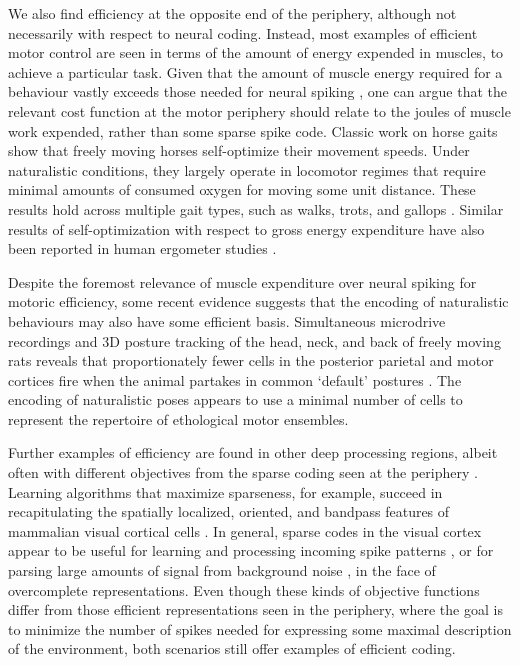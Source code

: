 \documentclass{article}
\begin{document}
We also find efficiency at the opposite end of the periphery, although not necessarily with respect to neural coding. Instead, most examples of efficient motor control are seen in terms of the amount of energy expended in muscles, to achieve a particular task. Given that the amount of muscle energy required for a behaviour vastly exceeds those needed for neural spiking \cite{sengupta_2010, ortega_2015}, one can argue that the relevant cost function at the motor periphery should relate to the joules of muscle work expended, rather than some sparse spike code. Classic work on horse gaits show that freely moving horses self-optimize their movement speeds. Under naturalistic conditions, they largely operate in locomotor regimes that require minimal amounts of consumed oxygen for moving some unit distance. These results hold across multiple gait types, such as walks, trots, and gallops \cite{hoyt_taylor_1981}. Similar results of self-optimization with respect to gross energy expenditure have also been reported in human ergometer studies \cite{sparrow_newell_1998}. 

Despite the foremost relevance of muscle expenditure over neural spiking for motoric efficiency, some recent evidence suggests that the encoding of naturalistic behaviours may also have some efficient basis. Simultaneous microdrive recordings and 3D posture tracking of the head, neck, and back of freely moving rats reveals that proportionately fewer cells in the posterior parietal and motor cortices fire when the animal partakes in common `default' postures \cite{Mimica_Dunn_Tombaz_Bojja_Whitlock_2018}. The encoding of naturalistic poses appears to use a minimal number of cells to represent the repertoire of ethological motor ensembles. 

Further examples of efficiency are found in other deep processing regions, albeit often with different objectives from the sparse coding seen at the periphery \cite{simoncelli_2003}. Learning algorithms that maximize sparseness, for example, succeed in recapitulating the spatially localized, oriented, and bandpass features of mammalian visual cortical cells \cite{olshausen_field_1996}. In general, sparse codes in the visual cortex appear to be useful for learning and processing incoming spike patterns \cite{olshausen_field_1996}, or for parsing large amounts of signal from background noise \cite{ringach_malone_2007}, in the face of overcomplete representations. Even though these kinds of objective functions differ from those efficient representations seen in the periphery, where the goal is to minimize the number of spikes needed for expressing some maximal description of the environment, both scenarios still offer examples of efficient coding. 
\end{document}
